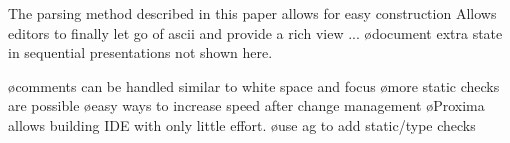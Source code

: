 \documentclass{article}[10pt]
\begin{document}
The parsing method described in this paper allows for easy construction Allows editors to finally let go of ascii and provide a rich view ...
\ec
\bc
\bl
\o document extra state in sequential presentations not shown here.
\el

\bl
\o comments can be handled similar to white space and focus
\o more static checks are possible
\o easy ways to increase speed after change management
\o Proxima allows building IDE with only little effort.
\o use ag to add static/type checks
\el
\ec


%



\end{document}
